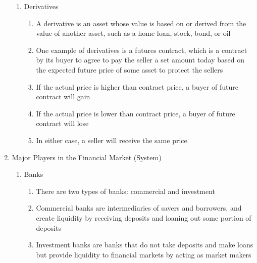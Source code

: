\documentclass[12pt]{article}
\begin{document}
\begin{enumerate}
\begin{enumerate}
          \item Derivatives

            \begin{enumerate}

              \item A derivative is an asset whose value is based on or derived from the value of another asset, such as a home loan, stock, bond, or oil

              \item One example of derivatives is a futures contract, which is a contract by its buyer to agree to pay the seller a set amount today based on the expected future price of some asset to protect the sellers

              \item If the actual price is higher than contract price, a buyer of future contract will gain

              \item If the actual price is lower than contract price, a buyer of future contract will lose

              \item In either case, a seller will receive the same price

            \end{enumerate}

        \end{enumerate}

      \item Major Players in the Financial Market (System)

        \begin{enumerate}

          \item Banks

            \begin{enumerate}

              \item There are two types of banks: commercial and investment

              \item Commercial banks are intermediaries of savers and borrowers, and create liquidity by receiving deposits and loaning out some portion of deposits

              \item Investment banks are banks that do not take deposits and make loans but provide liquidity to financial markets by acting as market makers


\end{enumerate}
\end{enumerate}
\end{enumerate}
\end{document}

